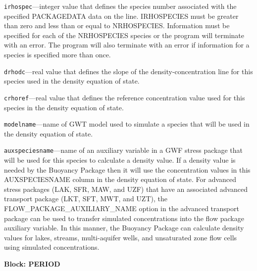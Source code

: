 \begin{description}
\item \texttt{irhospec}---integer value that defines the species number associated with the specified PACKAGEDATA data on the line. IRHOSPECIES must be greater than zero and less than or equal to NRHOSPECIES. Information must be specified for each of the NRHOSPECIES species or the program will terminate with an error.  The program will also terminate with an error if information for a species is specified more than once.

\item \texttt{drhodc}---real value that defines the slope of the density-concentration line for this species used in the density equation of state.

\item \texttt{crhoref}---real value that defines the reference concentration value used for this species in the density equation of state.

\item \texttt{modelname}---name of GWT model used to simulate a species that will be used in the density equation of state.

\item \texttt{auxspeciesname}---name of an auxiliary variable in a GWF stress package that will be used for this species to calculate a density value.  If a density value is needed by the Buoyancy Package then it will use the concentration values in this AUXSPECIESNAME column in the density equation of state.  For advanced stress packages (LAK, SFR, MAW, and UZF) that have an associated advanced transport package (LKT, SFT, MWT, and UZT), the FLOW\_PACKAGE\_AUXILIARY\_NAME option in the advanced transport package can be used to transfer simulated concentrations into the flow package auxiliary variable.  In this manner, the Buoyancy Package can calculate density values for lakes, streams, multi-aquifer wells, and unsaturated zone flow cells using simulated concentrations.

\end{description}
\item \textbf{Block: PERIOD}

